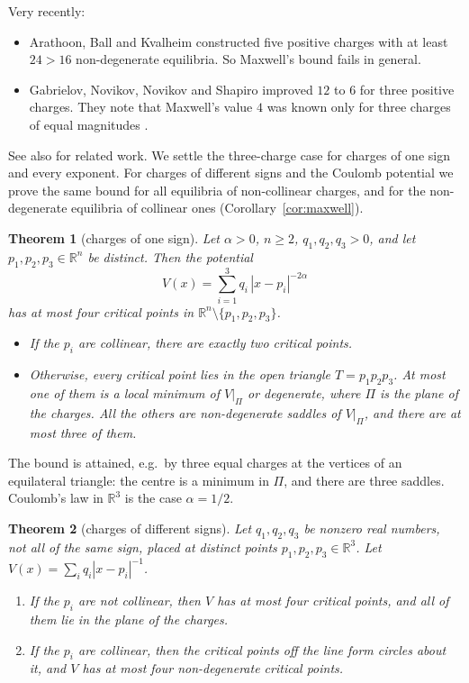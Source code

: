 \documentclass[11pt]{amsart}
\newtheorem{theorem}{Theorem}[section]
\theoremstyle{remark}
\newcommand{\R}{\mathbb{R}}
\begin{document}
Very recently:
\begin{itemize}
\item Arathoon, Ball and Kvalheim \cite{ABK} constructed five positive charges with at least $24>16$ non-degenerate
  equilibria. So Maxwell's bound fails in general.
\item Gabrielov, Novikov, Novikov and Shapiro \cite{GNNS} improved $12$ to $6$ for three positive charges. They note
  that Maxwell's value $4$ was known only for three charges of equal magnitudes \cite{Tsai}.
\end{itemize}
See also \cite{EFO,EP,Oli,Zol} for related work. We settle the three-charge case for charges of one sign and every
exponent. For charges of different signs and the Coulomb potential we prove the same bound for all equilibria of
non-collinear charges, and for the non-degenerate equilibria of collinear ones (Corollary~\ref{cor:maxwell}).

\begin{theorem}[charges of one sign]\label{thm:one}
Let $\alpha>0$, $n\ge 2$, $q_1,q_2,q_3>0$, and let $p_1,p_2,p_3\in\R^n$ be distinct. Then the potential
\[
  V(x)=\sum_{i=1}^{3}q_i\,|x-p_i|^{-2\alpha}
\]
has at most four critical points in $\R^n\setminus\{p_1,p_2,p_3\}$.
\begin{itemize}
\item If the $p_i$ are collinear, there are exactly two critical points.
\item Otherwise, every critical point lies in the open triangle $T=p_1p_2p_3$. At most one of them is a local minimum of
  $V|_\Pi$ or degenerate, where $\Pi$ is the plane of the charges. All the others are non-degenerate saddles of
  $V|_\Pi$, and there are at most three of them.
\end{itemize}
\end{theorem}

The bound is attained, e.g.\ by three equal charges at the vertices of an equilateral triangle: the centre is a minimum
in $\Pi$, and there are three saddles. Coulomb's law in $\R^3$ is the case $\alpha=1/2$.

\begin{theorem}[charges of different signs]\label{thm:mixed}
Let $q_1,q_2,q_3$ be nonzero real numbers, not all of the same sign, placed at distinct points $p_1,p_2,p_3\in\R^3$. Let
$V(x)=\sum_iq_i|x-p_i|^{-1}$.
\begin{enumerate}
\item[(a)] If the $p_i$ are not collinear, then $V$ has at most four critical points, and all of them lie in the plane of
  the charges.
\item[(b)] If the $p_i$ are collinear, then the critical points off the line form circles about it, and $V$ has at most
  four non-degenerate critical points.
\end{enumerate}
\end{theorem}
\end{document}
